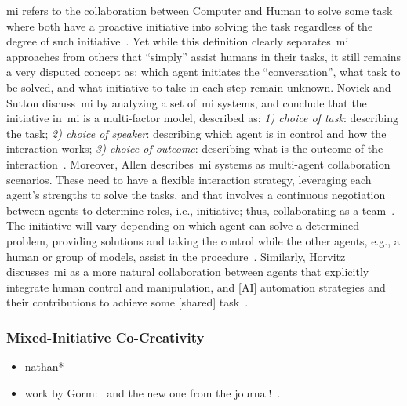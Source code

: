 \acrfull{mi} refers to the collaboration between Computer and Human to solve some task where both have a proactive initiative into solving the task regardless of the degree of such initiative~\cite{liapis_searching_2014}. Yet while this definition clearly separates~\acrshort{mi} approaches from others that ``simply'' assist humans in their tasks, it still remains a very disputed concept as: which agent initiates the ``conversation'', what task to be solved, and what initiative to take in each step remain unknown. Novick and Sutton discuss~\acrshort{mi} by analyzing a set of~\acrshort{mi} systems, and conclude that the initiative in~\acrshort{mi} is a multi-factor model, described as: \textit{1) choice of task}: describing the task; \textit{2) choice of speaker}: describing which agent is in control and how the interaction works; \textit{3) choice of outcome}: describing what is the outcome of the interaction~\cite{novick_what_1997}. Moreover, Allen describes~\acrshort{mi} systems as multi-agent collaboration scenarios. These need to have a flexible interaction strategy, leveraging each agent's strengths to solve the tasks, and that involves a continuous negotiation between agents to determine roles, i.e., initiative; thus, collaborating as a team~\cite{allen_mixed-initiative_1999}. The initiative will vary depending on which agent can solve a determined problem, providing solutions and taking the control while the other agents, e.g., a human or group of models, assist in the procedure~\cite{ferguson_mixed-initiative_2007}. Similarly, Horvitz discusses~\acrshort{mi} as a more natural collaboration between agents that explicitly integrate human control and manipulation, and [AI] automation strategies and their contributions to achieve some [shared] task~\cite{horvitz_uncertainty_1999,horvitz_principles_1999}.


\subsubsection{Mixed-Initiative Co-Creativity}

\begin{itemize}
    \item nathan*~\cite{partlan_design-driven_2021}
    \item work by Gorm:~\cite{lai_towards_2020} and the new one from the journal!~\cite{lai_mixed-initiative_2022}.
\end{itemize}


